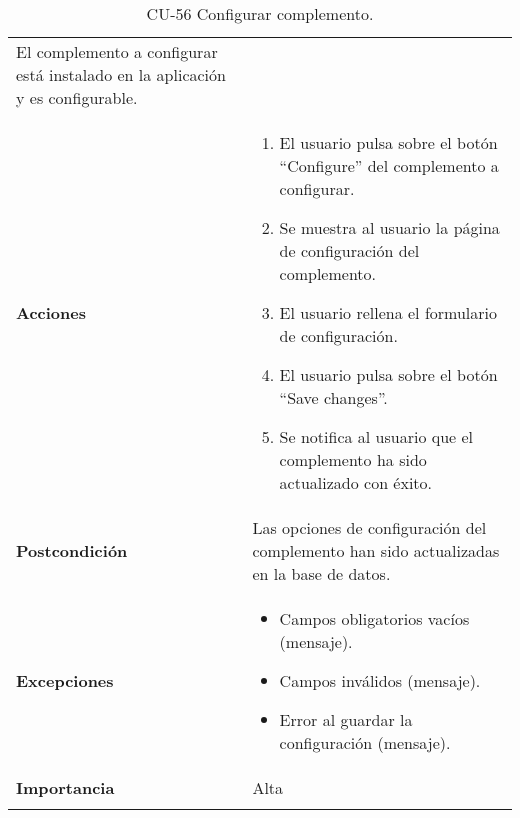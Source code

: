 \begin{longtable}[]{@{}ll@{}}
\begin{minipage}[t]{0.73\columnwidth}
El complemento a configurar está instalado en la aplicación y es
configurable.\strut
\end{minipage}\tabularnewline
\begin{minipage}[t]{0.21\columnwidth}\raggedright
\textbf{Acciones}\strut
\end{minipage} & \begin{minipage}[t]{0.73\columnwidth}\raggedright
\begin{enumerate}
\def\labelenumi{\arabic{enumi}.}
\tightlist
\item
  El usuario pulsa sobre el botón ``Configure'' del complemento a
  configurar.
\item
  Se muestra al usuario la página de configuración del complemento.
\item
  El usuario rellena el formulario de configuración.
\item
  El usuario pulsa sobre el botón ``Save changes''.
\item
  Se notifica al usuario que el complemento ha sido actualizado con
  éxito.
\end{enumerate}\strut
\end{minipage}\tabularnewline
\begin{minipage}[t]{0.21\columnwidth}\raggedright
\textbf{Postcondición}\strut
\end{minipage} & \begin{minipage}[t]{0.73\columnwidth}\raggedright
Las opciones de configuración del complemento han sido actualizadas en
la base de datos.\strut
\end{minipage}\tabularnewline
\begin{minipage}[t]{0.21\columnwidth}\raggedright
\textbf{Excepciones}\strut
\end{minipage} & \begin{minipage}[t]{0.73\columnwidth}\raggedright
\begin{itemize}
\tightlist
\item
  Campos obligatorios vacíos (mensaje).
\item
  Campos inválidos (mensaje).
\item
  Error al guardar la configuración (mensaje).
\end{itemize}\strut
\end{minipage}\tabularnewline
\begin{minipage}[t]{0.21\columnwidth}\raggedright
\textbf{Importancia}\strut
\end{minipage} & \begin{minipage}[t]{0.73\columnwidth}\raggedright
Alta\strut
\end{minipage}\tabularnewline
\bottomrule
\caption{CU-56 Configurar complemento.}
\end{longtable}

